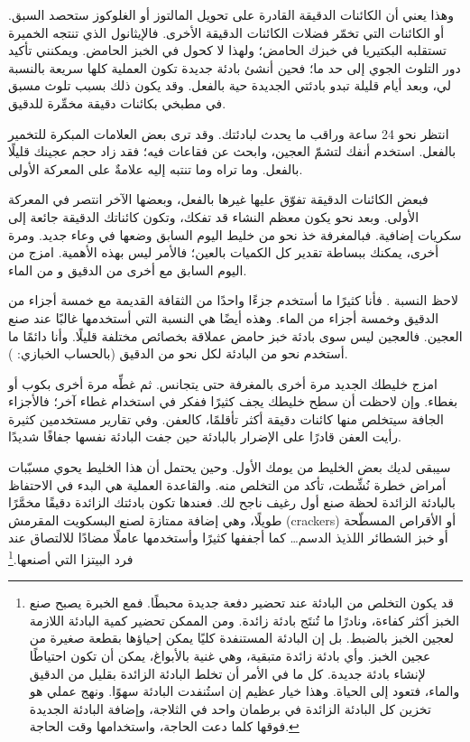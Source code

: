 وهذا يعني أن الكائنات الدقيقة القادرة على تحويل المالتوز أو الغلوكوز ستحصد السبق. أو الكائنات التي تخمّر فضلات الكائنات الدقيقة الأخرى. فالإيثانول الذي تنتجه الخميرة تستقلبه البكتيريا في خبزك الحامض؛ ولهذا لا كحول في الخبز الحامض. ويمكنني تأكيد دور التلوث الجوي إلى حد ما؛ فحين أنشئ بادئة جديدة تكون العملية كلها سريعة بالنسبة لي، وبعد أيام قليلة تبدو بادئتي الجديدة حية بالفعل. وقد يكون ذلك بسبب تلوث مسبق في مطبخي بكائنات دقيقة مخمِّرة للدقيق.

انتظر نحو 24 ساعة وراقب ما يحدث لبادئتك. وقد ترى بعض العلامات المبكرة للتخمير بالفعل. استخدم أنفك لتشمّ العجين، وابحث عن فقاعات فيه؛ فقد زاد حجم عجينك قليلًا بالفعل. وما تراه وما تنتبه إليه علامةٌ على المعركة الأولى.

فبعض الكائنات الدقيقة تفوّق عليها غيرها بالفعل، وبعضها الآخر انتصر في المعركة الأولى. وبعد نحو  يكون معظم النشاء قد تفكك، وتكون كائناتك الدقيقة جائعة إلى سكريات إضافية. فبالمغرفة خذ نحو  من خليط اليوم السابق وضعها في وعاء جديد. ومرة أخرى، يمكنك ببساطة تقدير كل الكميات بالعين؛ فالأمر ليس بهذه الأهمية. امزج  من اليوم السابق مع  أخرى من الدقيق و من الماء.

لاحظ النسبة . فأنا كثيرًا ما أستخدم جزءًا واحدًا من الثقافة القديمة مع خمسة أجزاء من الدقيق وخمسة أجزاء من الماء. وهذه أيضًا هي النسبة التي أستخدمها غالبًا عند صنع العجين. فالعجين ليس سوى بادئة خبز حامض عملاقة بخصائص مختلفة قليلًا. وأنا دائمًا ما أستخدم نحو  من البادئة لكل نحو  من الدقيق (بالحساب الخبازي: ).

امزج خليطك الجديد مرة أخرى بالمغرفة حتى يتجانس. ثم غطِّه مرة أخرى بكوب أو بغطاء. وإن لاحظت أن سطح خليطك يجف كثيرًا ففكر في استخدام غطاء آخر؛ فالأجزاء الجافة سيتخلص منها كائنات دقيقة أكثر تأقلمًا، كالعفن. وفي تقارير مستخدمين كثيرة رأيت العفن قادرًا على الإضرار بالبادئة حين جفت البادئة نفسها جفافًا شديدًا.

سيبقى لديك بعض الخليط من يومك الأول. وحين يحتمل أن هذا الخليط يحوي مسبّبات أمراض خطرة نُشِّطت، تأكد من التخلص منه. والقاعدة العملية هي البدء في الاحتفاظ بالبادئة الزائدة لحظة صنع أول رغيف ناجح لك. فعندها تكون بادئتك الزائدة دقيقًا مخمَّرًا طويلًا، وهي إضافة ممتازة لصنع البسكويت المقرمش \textenglish{(crackers)} أو الأقراص المسطّحة أو خبز الشطائر اللذيذ الدسم… كما أجففها كثيرًا وأستخدمها عاملًا مضادًا للالتصاق عند فرد البيتزا التي أصنعها.\footnote{قد يكون التخلص من البادئة عند تحضير دفعة جديدة محبطًا. فمع الخبرة يصبح صنع الخبز أكثر كفاءة، ونادرًا ما تُنتَج بادئة زائدة. ومن الممكن تحضير كمية البادئة اللازمة لعجين الخبز بالضبط. بل إن البادئة المستنفدة كليًا يمكن إحياؤها بقطعة صغيرة من عجين الخبز. وأي بادئة زائدة متبقية، وهي غنية بالأبواغ، يمكن أن تكون احتياطًا لإنشاء بادئة جديدة. كل ما في الأمر أن تخلط البادئة الزائدة بقليل من الدقيق والماء، فتعود إلى الحياة. وهذا خيار عظيم إن استُنفدت البادئة سهوًا. ونهج عملي هو تخزين كل البادئة الزائدة في برطمان واحد في الثلاجة، وإضافة البادئة الجديدة فوقها كلما دعت الحاجة، واستخدامها وقت الحاجة.}

